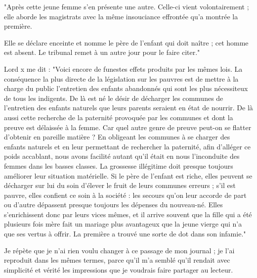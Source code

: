 \documentclass[french,twoside]{book} %
\begin{document}
"Après cette jeune femme s’en présente une autre. Celle-ci vient volontairement ; elle aborde les magistrats avec la même insouciance effrontée qu’a montrée la première.\par
Elle se déclare enceinte et nomme le père de l’enfant qui doit naître ; cet homme est absent. Le tribunal remet à un autre jour pour le faire citer."\par
Lord x me dit : "Voici encore de funestes effets produits par les mêmes lois. La conséquence la plus directe de la législation sur les pauvres est de mettre à la charge du public l’entretien des enfants abandonnés qui sont les plus nécessiteux de tous les indigents. De là est né le désir de décharger les communes de l’entretien des enfants naturels que leurs parents seraient en état de nourrir. De là aussi cette recherche de la paternité provoquée par les communes et dont la preuve est délaissée à la femme. Car quel autre genre de preuve peut-on se flatter d’obtenir en pareille matière ? En obligeant les communes à se charger des enfants naturels et en leur permettant de rechercher la paternité, afin d’alléger ce poids accablant, nous avons facilité autant qu’il était en nous l’inconduite des femmes dans les basses classes. La grossesse illégitime doit presque toujours améliorer leur situation matérielle. Si le père de l’enfant est riche, elles peuvent se décharger sur lui du soin d’élever le fruit de leurs communes erreurs ; s’il est pauvre, elles confient ce soin à la société : les secours qu’on leur accorde de part ou d’autre dépassent presque toujours les dépenses du nouveau-né. Elles s’enrichissent donc par leurs vices mêmes, et il arrive souvent que la fille qui a été plusieurs fois mère fait un mariage plus avantageux que la jeune vierge qui n’a que ses vertus à offrir. La première a trouvé une sorte de dot dans son infamie."\par
Je répète que je n’ai rien voulu changer à ce passage de mon journal ; je l’ai reproduit dans les mêmes termes, parce qu’il m’a semblé qu’il rendait avec simplicité et vérité les impressions que je voudrais faire partager au lecteur.\par
\end{document}
